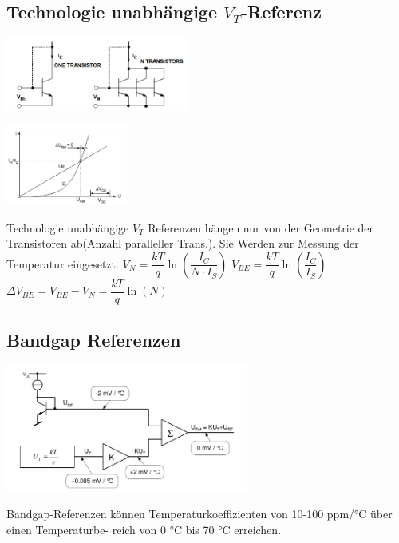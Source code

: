 \subsection{Technologie unabhängige $V_T$-Referenz}
	\begin{minipage}{150pt}
	\includegraphics[width = 6cm]{images/spgref/01_vtref.png}
	\end{minipage}
	\begin{minipage}{150pt}
	\includegraphics[width = 4cm]{images/spgref/02_vtref_diag.png}
	\end{minipage}
	\begin{minipage}{200pt}
	Technologie unabhängige $V_T$ Referenzen hängen nur von der Geometrie der Transistoren ab(Anzahl paralleller Trans.). Sie Werden zur Messung der Temperatur eingesetzt.\newline
	$V_N = \dfrac{kT}{q}\ln\left(\dfrac{I_C}{N\cdot I_S}\right) $ \newline
	$V_{BE} =\dfrac{kT}{q}\ln\left(\dfrac{I_C}{I_S}\right)$\newline
	$\Delta V_{BE} = V_{BE} -V_N = \dfrac{kT}{q}\ln(N)$
	\end{minipage}
\subsection{Bandgap Referenzen}
	\begin{minipage}{250pt}
		\includegraphics[width = 8cm]{./images/spgref/03_bandgap.png}
	\end{minipage}
 	\begin{minipage}{250pt}
 	Bandgap-Referenzen können Temperaturkoeffizienten von 10-100 ppm/°C über einen Temperaturbe-
 	reich von 0 °C bis 70 °C erreichen.
 	\end{minipage}
